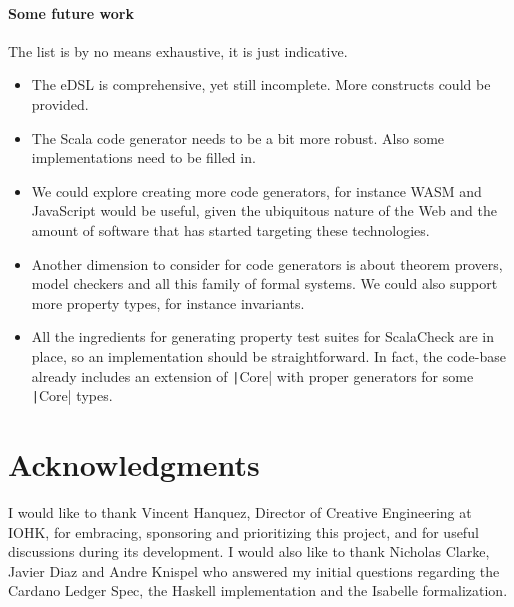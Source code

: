 \documentclass[11pt]{article}
\newcommand{\ScalaI}[1]{\texttt|#1|}
\begin{document}
\paragraph*{Some future work}
The list is by no means exhaustive, it is just indicative.
\begin{itemize}
  \item The eDSL is comprehensive, yet still incomplete. More constructs could be provided. 
  
  \item The Scala code generator needs to be a bit more robust. Also some implementations need to be filled in.
  
  \item We could explore creating more code generators, for instance WASM and JavaScript would be useful, given the ubiquitous nature of the Web and the amount of software that has started targeting these technologies.
  
  \item Another dimension to consider for code generators is about theorem provers, model checkers and all this family of formal systems. We could also support more property types, for instance invariants.
  
  \item All the ingredients for generating property test suites for ScalaCheck are in place, so an implementation should be straightforward. In fact, the code-base already includes an extension of \ScalaI{Core} with proper generators for some \ScalaI{Core} types.
 
\end{itemize}

\section{Acknowledgments}
I would like to thank Vincent Hanquez, Director of Creative Engineering at IOHK, for embracing, sponsoring and prioritizing this project, and for useful discussions during its development. I would also like to thank Nicholas Clarke, Javier Diaz and Andre Knispel who answered my initial questions regarding the Cardano Ledger Spec, the Haskell implementation and the Isabelle formalization.
\end{document}
